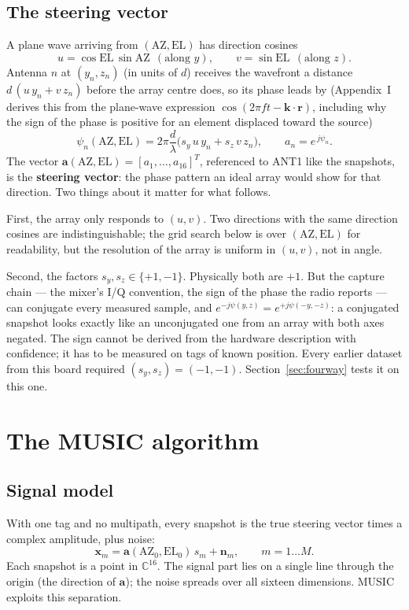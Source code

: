 \documentclass[11pt,a4paper]{article}
\newcommand{\vect}[1]{\mathbf{#1}}
\begin{document}
\subsection{The steering vector}
A plane wave arriving from $(\mathrm{AZ}, \mathrm{EL})$ has direction cosines
\[
  u = \cos\mathrm{EL}\,\sin\mathrm{AZ} \ \ (\text{along } y), \qquad
  v = \sin\mathrm{EL} \ \ (\text{along } z).
\]
Antenna $n$ at $(y_n, z_n)$ (in units of $d$) receives the wavefront a distance $d\,(u\,y_n + v\,z_n)$ before the array centre does, so its phase leads by (Appendix~I derives this from the plane-wave expression $\cos(2\pi f t - \vect k\cdot\vect r)$, including why the sign of the phase is positive for an element displaced toward the source)
\begin{equation}
  \psi_n(\mathrm{AZ}, \mathrm{EL}) = 2\pi\frac{d}{\lambda}\big(s_y\,u\,y_n + s_z\,v\,z_n\big),
  \qquad a_n = e^{\,j\psi_n}.
  \label{eq:steer}
\end{equation}
The vector $\vect a(\mathrm{AZ}, \mathrm{EL}) = [a_1, \dots, a_{16}]^T$, referenced to ANT1 like the snapshots, is the \textbf{steering vector}: the phase pattern an ideal array would show for that direction. Two things about it matter for what follows.

First, the array only responds to $(u, v)$. Two directions with the same direction cosines are indistinguishable; the grid search below is over $(\mathrm{AZ}, \mathrm{EL})$ for readability, but the resolution of the array is uniform in $(u, v)$, not in angle.

Second, the factors $s_y, s_z \in \{+1, -1\}$. Physically both are $+1$. But the capture chain --- the mixer's I/Q convention, the sign of the phase the radio reports --- can conjugate every measured sample, and $e^{-j\psi(y, z)} = e^{+j\psi(-y, -z)}$: a conjugated snapshot looks exactly like an unconjugated one from an array with both axes negated. The sign cannot be derived from the hardware description with confidence; it has to be measured on tags of known position. Every earlier dataset from this board required $(s_y, s_z) = (-1, -1)$. Section~\ref{sec:fourway} tests it on this one.

\section{The MUSIC algorithm}

\subsection{Signal model}
With one tag and no multipath, every snapshot is the true steering vector times a complex amplitude, plus noise:
\[
  \vect x_m = \vect a(\mathrm{AZ}_0, \mathrm{EL}_0)\, s_m + \vect n_m, \qquad m = 1\dots M.
\]
Each snapshot is a point in $\mathbb C^{16}$. The signal part lies on a single line through the origin (the direction of $\vect a$); the noise spreads over all sixteen dimensions. MUSIC exploits this separation.
\end{document}
